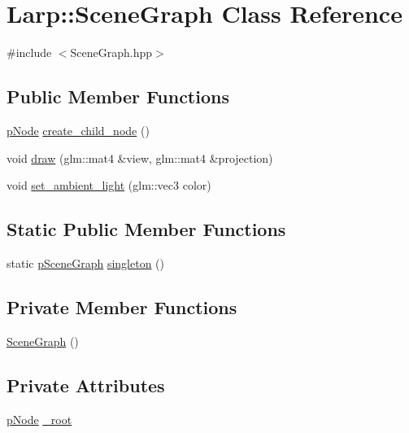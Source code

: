 \hypertarget{classLarp_1_1SceneGraph}{}\section{Larp\+:\+:Scene\+Graph Class Reference}
\label{classLarp_1_1SceneGraph}


{\ttfamily \#include $<$Scene\+Graph.\+hpp$>$}

\subsection*{Public Member Functions}
\begin{DoxyCompactItemize}
\item 
\hyperlink{namespaceLarp_a57e9a3e29e68cdf508c964274d9ac1a4}{p\+Node} \hyperlink{classLarp_1_1SceneGraph_ae5e5217dc191780b0e7a05fe2b490d90}{create\+\_\+child\+\_\+node} ()
\item 
void \hyperlink{classLarp_1_1SceneGraph_a8113f5f330d20c966c5f2403e1e6386b}{draw} (glm\+::mat4 \&view, glm\+::mat4 \&projection)
\item 
void \hyperlink{classLarp_1_1SceneGraph_a3b99e07a52de26cb627e4f6e908a2299}{set\+\_\+ambient\+\_\+light} (glm\+::vec3 color)
\end{DoxyCompactItemize}
\subsection*{Static Public Member Functions}
\begin{DoxyCompactItemize}
\item 
static \hyperlink{namespaceLarp_a590f73362521ab6a9c682d4eb2719002}{p\+Scene\+Graph} \hyperlink{classLarp_1_1SceneGraph_a5a34524c135b74f97a699aef4dc146b5}{singleton} ()
\end{DoxyCompactItemize}
\subsection*{Private Member Functions}
\begin{DoxyCompactItemize}
\item 
\hyperlink{classLarp_1_1SceneGraph_a256e0ff974a0f905a848a99f18b7ffc4}{Scene\+Graph} ()
\end{DoxyCompactItemize}
\subsection*{Private Attributes}
\begin{DoxyCompactItemize}
\item 
\hyperlink{namespaceLarp_a57e9a3e29e68cdf508c964274d9ac1a4}{p\+Node} \hyperlink{classLarp_1_1SceneGraph_adf33065344039fd7fce5f828e800137f}{\+\_\+root}
\end{DoxyCompactItemize}
